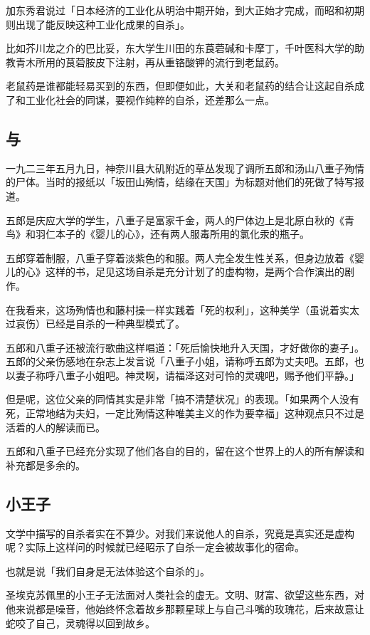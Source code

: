 \documentclass[UTF8]{ctexart}
\begin{document}
加东秀君说过「日本经济的工业化从明治中期开始，到大正始才完成，而昭和初期则出现了能反映这种工业化成果的自杀」。

比如芥川龙之介的巴比妥，东大学生川田的东莨菪碱和卡摩丁，千叶医科大学的助教青木所用的茛菪胺皮下注射，再从重铬酸钾的流行到老鼠药。

老鼠药是谁都能轻易买到的东西，但即便如此，大关和老鼠药的结合让这起自杀成了和工业化社会的同谋，要视作纯粹的自杀，还差那么一点。

\subsection{与}

一九二三年五月九日，神奈川县大矶附近的草丛发现了调所五郎和汤山八重子殉情的尸体。当时的报纸以「坂田山殉情，结缘在天国」为标题对他们的死做了特写报道。

五郎是庆应大学的学生，八重子是富家千金，两人的尸体边上是北原白秋的《青鸟》和羽仁本子的《婴儿的心》，还有两人服毒所用的氯化汞的瓶子。

五郎穿着制服，八重子穿着淡紫色的和服。两人完全发生性关系，但身边放着《婴儿的心》这样的书，足见这场自杀是充分计划了的虚构物，是两个合作演出的剧作。

在我看来，这场殉情也和藤村操一样实践着「死的权利」，这种美学（虽说着实太过哀伤）已经是自杀的一种典型模式了。

五郎和八重子还被流行歌曲这样唱道：「死后愉快地升入天国，才好做你的妻子」。
五郎的父亲伤感地在杂志上发言说「八重子小姐，请称呼五郎为丈夫吧。五郎，也以妻子称呼八重子小姐吧。神灵啊，请福泽这对可怜的灵魂吧，赐予他们平静。」

但是呢，这位父亲的同情其实是非常「搞不清楚状况」的表现。「如果两个人没有死，正常地结为夫妇，一定比殉情这种唯美主义的作为要幸福」这种观点只不过是活着的人的解读而已。

五郎和八重子已经充分实现了他们各自的目的，留在这个世界上的人的所有解读和补充都是多余的。

\subsection{小王子}
文学中描写的自杀者实在不算少。对我们来说他人的自杀，究竟是真实还是虚构呢？实际上这样问的时候就已经昭示了自杀一定会被故事化的宿命。

也就是说「我们自身是无法体验这个自杀的」。

圣埃克苏佩里的小王子无法面对人类社会的虚无。文明、财富、欲望这些东西，对他来说都是噪音，他始终怀念着故乡那颗星球上与自己斗嘴的玫瑰花，后来故意让蛇咬了自己，灵魂得以回到故乡。
\end{document}
